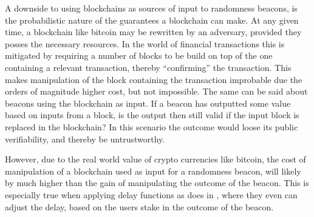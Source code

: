 A downside to using blockchains as sources of input to randomness beacons, is the probabilistic nature of the guarantees a blockchain can make.
At any given time, a blockchain like bitcoin may be rewritten by an adversary, provided they posses the necessary resources.
In the world of financial transactions this is mitigated by requiring a number of blocks to be build on top of the one containing a relevant transaction, thereby \enquote{confirming} the transaction.
This makes manipulation of the block containing the transaction improbable due the orders of magnitude higher cost, but not impossible.
The same can be said about beacons using the blockchain as input.
If a beacon has outputted some value based on inputs from a block, is the output then still valid if the input block is replaced in the blockchain?
In this scenario the outcome would loose its public verifiability, and thereby be untrustworthy.

However, due to the real world value of crypto currencies like bitcoin, the cost of manipulation of a blockchain used as input for a randomness beacon, will likely by much higher than the gain of manipulating the outcome of the beacon.
This is especially true when applying delay functions as \citet{bunz2017proofsof} does in , where they even can adjust the delay, based on the users stake in the outcome of the beacon.

